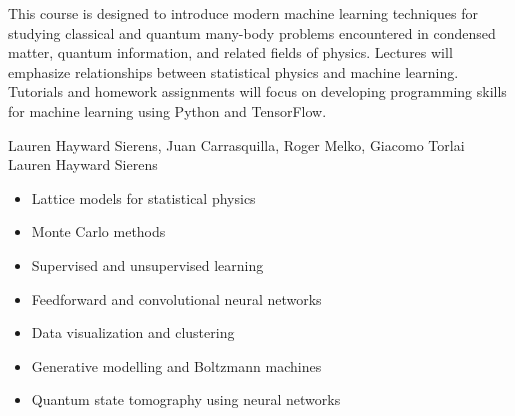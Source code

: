 \documentclass[letterpaper]{scrartcl}
\begin{document}

\title{}
\date{}
\maketitle
\thispagestyle{empty}

\vspace*{-3cm}
\noindent{} 
\normalfont This course is designed to introduce modern machine learning techniques for studying classical and quantum many-body problems encountered in condensed matter, quantum information, and related fields of physics. 
Lectures will emphasize relationships between statistical physics and machine learning. 
Tutorials and homework assignments will focus on developing programming skills for machine learning using Python and TensorFlow.

\vspace*{0.8cm}
\noindent{} \normalfont 
Lauren Hayward Sierens, Juan Carrasquilla, Roger Melko, Giacomo Torlai \\
\noindent{} \normalfont Lauren Hayward Sierens

\vspace*{0.8cm}
\noindent{} 
\normalfont 
\begin{itemize} 
\setlength\itemsep{0em}
\item Lattice models for statistical physics 
\item Monte Carlo methods 
\item Supervised and unsupervised learning 
\item Feedforward and convolutional neural networks
\item Data visualization and clustering
\item Generative modelling and Boltzmann machines
\item Quantum state tomography using neural networks
\end{itemize}
\end{document}
